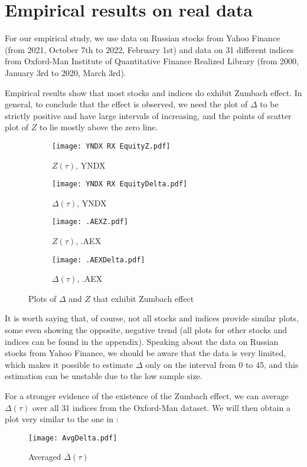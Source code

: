 \section{Empirical results on real data}

For our empirical study, we use data on Russian stocks from Yahoo Finance (from 2021, October 7th to 2022, February 1st) and data on 31 different indices from Oxford-Man Institute of Quantitative Finance Realized Library (from 2000, January 3rd to 2020, March 3rd).

Empirical results show that most stocks and indices do exhibit Zumbach effect. In general, to conclude that the effect is observed, we need the plot of $\Delta$ to be strictly positive and have large intervals of increasing, and the points of scatter plot of $Z$ to lie mostly above the zero line.


\begin{figure}[htbp]
\begin{subfigure}{.5\textwidth}
  \centering
  \texttt{[image: YNDX RX EquityZ.pdf]}  
  \caption{$Z(\tau)$, YNDX}
  \label{fig:YNDXZ}
\end{subfigure}
\begin{subfigure}{.5\textwidth}
  \centering
  \texttt{[image: YNDX RX EquityDelta.pdf]}  
  \caption{$\Delta(\tau)$, YNDX}
  \label{fig:YNDXDelta}
\end{subfigure}


\begin{subfigure}{.5\textwidth}
  \centering
  \texttt{[image: .AEXZ.pdf]}  
  \caption{$Z(\tau)$, .AEX}
  \label{fig:AEXZ}
\end{subfigure}
\begin{subfigure}{.5\textwidth}
  \centering
  \texttt{[image: .AEXDelta.pdf]}  
  \caption{$\Delta(\tau)$, .AEX}
  \label{fig:AEXDelta}
\end{subfigure}
\caption{Plots of $\Delta$ and $Z$ that exhibit Zumbach effect}
\label{fig:FigYNDXAEX}
\end{figure}

It is worth saying that, of course, not all stocks and indices provide similar plots, some even showing the opposite, negative trend (all plots for other stocks and indices can be found in the appendix). Speaking about the data on Russian stocks from Yahoo Finance, we should be aware that the data is very limited, which makes it possible to estimate $\Delta$ only on the interval from 0 to 45, and this estimation can be unstable due to the low sample size.

For a stronger evidence of the existence of the Zumbach effect, we can average $\Delta(\tau)$ over all 31 indices from the Oxford-Man dataset. We will then obtain a plot very similar to the one in \cite{EuchGatheral2018}:
\begin{figure}
    \centering
    \texttt{[image: AvgDelta.pdf]}
    \caption{Averaged $\bar{\Delta}(\tau)$}
    \label{fig:AvgDeltaOM}
\end{figure}

